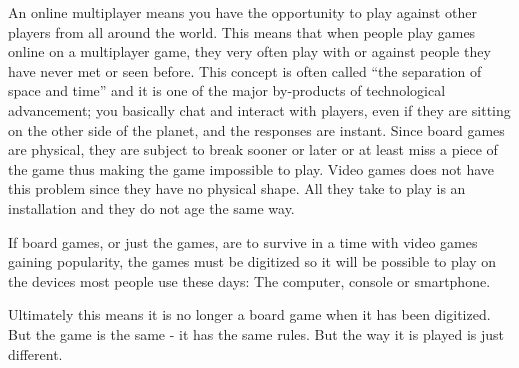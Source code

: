 An online multiplayer means you have the opportunity to play against other
players from all around the world. This means that when people play games
online on a multiplayer game, they very often play with or against people
they have never met or seen before. This concept is often called
“the separation of space and time” and it is one of the major by-products
 of technological advancement; you basically chat and interact with players,
  even if they are sitting on the other side of the planet, and the responses
   are instant.
Since board games are physical, they are subject to break sooner or later or
at least miss a piece of the game thus making the game impossible to play.
 Video games does not have this problem since they have no physical shape.
 All they take to play is an installation and they do not age the same
 way. \newline

If board games, or just the games, are to survive in a time with video games
gaining popularity, the games must be digitized so it will be possible to play
 on the devices most people use these days: The computer, console or
 smartphone. \newline

Ultimately this means it is no longer a board game when it has been digitized.
 But the game is the same - it has the same rules. But the way it is played is
  just different.\newline
